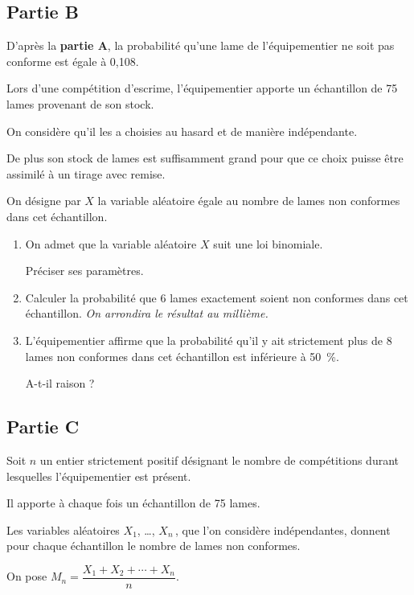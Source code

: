 \documentclass[10pt]{article}
\begin{document}
	\subsection*{Partie B}
	D'après la \textbf{partie A}, la probabilité qu'une lame de l'équipementier ne soit pas conforme est égale à 0,108.
	
	Lors d'une compétition d'escrime, l'équipementier apporte un échantillon de 75 lames provenant de son stock.
	
	On considère qu'il les a choisies au hasard et de manière indépendante.
	
	De plus son stock de lames est suffisamment grand pour que ce choix puisse être assimilé à un tirage avec remise.
	
	On désigne par $X$ la variable aléatoire égale au nombre de lames non conformes dans cet échantillon.
	
	\begin{enumerate}
		\item On admet que la variable aléatoire $X$ suit une loi binomiale.
		
		Préciser ses paramètres.
		
		\item Calculer la probabilité que 6 lames exactement soient non conformes dans cet échantillon. \emph{On arrondira le résultat au millième.}
		
		\item L'équipementier affirme que la probabilité qu'il y ait strictement plus de 8 lames non conformes dans cet échantillon est inférieure à 50~\%.
		
		A-t-il raison ?
	\end{enumerate}
	
	\subsection*{Partie C}
	Soit $n$ un entier strictement positif désignant le nombre de compétitions durant lesquelles l'équipementier est présent.
	
	Il apporte à chaque fois un échantillon de 75 lames.
	
	Les variables aléatoires $X_{1}$, \ldots, $X_{n}$\,, que l'on considère indépendantes, donnent pour chaque échantillon le nombre de lames non conformes.
	
	\smallskip
	
	On pose \quad $M_{n}=\dfrac{X_{1}+X_{2}+\cdots+X_{n}}{n}$.
	
\end{document}
